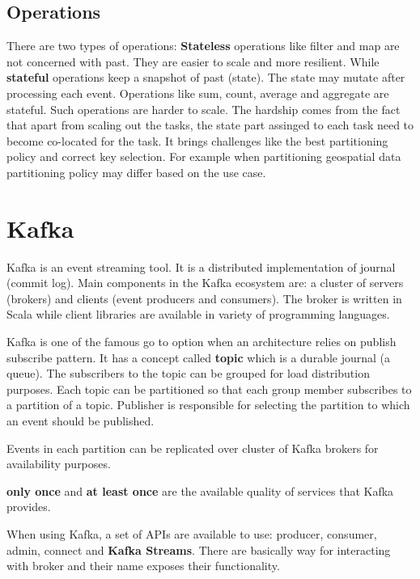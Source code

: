 \documentclass[a4]{report}
\begin{document}
    \subsection{Operations}
    There are two types of operations:
    \textbf{Stateless} operations like filter and map are not concerned with past.
    They are easier to scale and more resilient.
    While \textbf{stateful} operations keep a snapshot of past (state).
    The state may mutate after processing each event.
    Operations like sum, count, average and aggregate are stateful.
    Such operations are harder to scale.
    The hardship comes from the fact that apart from scaling out the tasks, the state part assinged to each task need
    to become co-located for the task.
    It brings challenges like the best partitioning policy and correct key selection.
    For example when partitioning geospatial data partitioning policy may differ based on the use case.


    \section{Kafka}
    Kafka\cite{kafka} is an event streaming tool.
    It is a distributed implementation of journal (commit log).
    Main components in the Kafka ecosystem are: a cluster of servers (brokers) and clients (event producers and consumers).
    The broker is written in Scala while client libraries are available in variety of programming languages.

    Kafka is one of the famous go to option when an architecture relies on publish subscribe pattern.
    It has a concept called \textbf{topic} which is a durable journal (a queue).
    The subscribers to the topic can be grouped for load distribution purposes.
    Each topic can be partitioned so that each group member subscribes to a partition of a topic.
    Publisher is responsible for selecting the partition to which an event should be published.

    Events in each partition can be replicated over cluster of Kafka brokers for availability purposes.

    \textbf{only once} and \textbf{at least once} are the available quality of services that Kafka provides.

    When using Kafka, a set of APIs are available to use: producer, consumer, admin, connect and \textbf{Kafka Streams}.
    There are basically way for interacting with broker and their name exposes their functionality.
\end{document}
